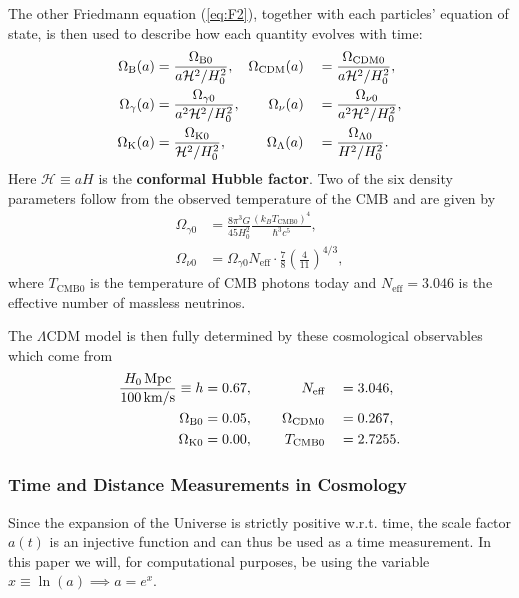 \documentclass[%
reprint,
 amsmath,amssymb,
 aps,
]{revtex4-2}
\newcommand{\Hp}{\mathcal{H}}
\begin{document}
The other Friedmann equation (\ref{eq:F2}), together with each particles' equation of state, is then used to describe how each quantity evolves with time:
\begin{alignat}{2}
	\Omega_{\text B}(a)&=\frac{\Omega_{\text B0}}{a\Hp^2/H_0^2},\hspace{3.5mm}\Omega_{\text{CDM}}(a)&&=\frac{\Omega_{\text{CDM}0}}{a\Hp^2/H_0^2},\nonumber\\
	\Omega_{\gamma}(a)&=\frac{\Omega_{\gamma0}}{a^2\Hp^2/H_0^2},\hspace{7mm}\Omega_{\nu}(a)&&=\frac{\Omega_{\nu0}}{a^2\Hp^2/H_0^2},\label{eq:Omegai}\\
	\Omega_{\text K}(a)&=\frac{\Omega_{\text K0}}{\Hp^2/H_0^2},\hspace{10mm}\Omega_{\Lambda}(a)&&=\frac{\Omega_{\Lambda0}}{H^2/H_0^2}.\nonumber
\end{alignat}
Here $\Hp\equiv aH$ is the \textbf{conformal Hubble factor}. Two of the six density parameters follow from the observed temperature of the CMB and are given by
\begin{align}
	\label{eq:ORad}
	\Omega_{\gamma0}&=\frac{8\pi^3 G}{45 H_0^2}\frac{(k_BT_{\text{CMB}0})^4}{\hbar^3 c^5},\\
	\label{eq:ONu}
	\Omega_{\nu0}&=\Omega_{\gamma0}N_{\text{eff}}\cdot\frac{7}{8}\left(\frac{4}{11}\right)^{4/3},
\end{align}
where $T_{\text{CMB}0}$ is the temperature of CMB photons today and $N_{\text{eff}}=3.046$ is the effective number of massless neutrinos. \cite{Planck:2018vyg}

The $\Lambda$CDM model is then fully determined by these cosmological observables which come from \cite{Planck:2018vyg}
\begin{alignat}{2}
	\frac{H_0\,\text{Mpc}}{100\,\text{km/s}}\equiv h &= 0.67,\hspace{12.2mm}N_\text{eff}&&=3.046,\nonumber\\
	\Omega_{\text B0}&=0.05,\hspace{7.3mm}\Omega_{\text{CDM}0}&&=0.267,\label{eq:planck_data}\\
	\Omega_{\text K0}&=0.00,\hspace{8mm}T_{\text{CMB}0}&&=2.7255.\nonumber
\end{alignat}
\subsubsection{Time and Distance Measurements in Cosmology}
Since the expansion of the Universe is strictly positive w.r.t. time, the scale factor $a(t)$ is an injective function and can thus be used as a time measurement. In this paper we will, for computational purposes, be using the variable $x\equiv\ln(a)\implies a=e^x$. 
\end{document}
